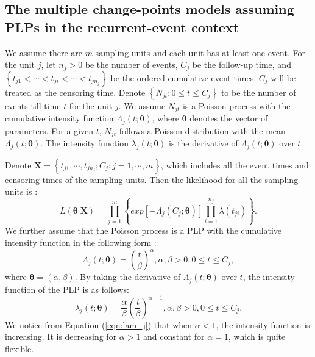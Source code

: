 \documentclass[12pt]{article}
\numberwithin{equation}{section}
\begin{document}
\subsection{The multiple change-points models assuming PLPs in the recurrent-event context}\label{sec:models.PLP}
We assume there are $m$ sampling units and each unit has at least one event. For the unit $j$, let $n_j>0$ be the number of events, $C_j$ be the follow-up time, and  $\left\lbrace t_{j1} < \cdots<t_{ji}<\cdots<t_{jn_j}\right\rbrace $ be the ordered cumulative event times. $C_j$ will be treated as the censoring time. Denote $\left\lbrace N_{jt}: 0\leq t \leq C_j\right\rbrace $ to be the number of events till time $t$ for the unit $j$. We assume  ${N_{jt}}$ is a Poisson process with the cumulative intensity function $\Lambda_j(t;\pmb\theta)$, where $\pmb\theta$ denotes the vector of parameters. For a given $t$, ${N_{jt}}$ follows a Poisson distribution with the mean $\Lambda_j(t;\pmb\theta)$. The intensity function $\lambda_j(t;\pmb\theta)$ is the derivative of $\Lambda_j(t;\pmb\theta)$ over $t$. 

Denote $\pmb X =\left\lbrace t_{j1},\cdots,t_{jn_j};C_j;j=1,\cdots,m\right\rbrace $, which includes all the event times and censoring times of the sampling units. Then the likelihood for all the sampling units is \citep{Thompson2012}:
\begin{equation}\label{eqn:l}
L(\pmb\theta|\pmb X) = \prod_{j=1}^{m}\left\lbrace exp\left[ -\Lambda_j(C_j;\pmb\theta)\right]\prod_{i=1}^{n_j}\lambda(t_{ji}) \right\rbrace. 
\end{equation} 
We further assume that the Poisson process is a PLP with the cumulative intensity function in the following form \citep{Crow1975}:
\begin{equation}\label{eqn:Lam_j}
\Lambda_j(t;\pmb\theta) = \left( \frac{t}{\beta}\right)^\alpha, \alpha, \beta >0, 0\leq t \leq C_j,
\end{equation} 
where $\pmb\theta = (\alpha, \beta)$. By taking the derivative of $\Lambda_j(t;\pmb\theta)$ over $t$, the intensity function of the PLP is as follows: 
\begin{equation}\label{eqn:lam_j}
\lambda_j(t;\pmb\theta) = \frac{\alpha}{\beta}\left( \frac{t}{\beta}\right)^{\alpha-1}, \alpha, \beta >0,0\leq t \leq C_j.
\end{equation}
We notice from Equation (\ref{eqn:lam_j}) that when $\alpha < 1$, the intensity function is increasing. It is decreasing for $\alpha > 1$ and constant for $\alpha = 1$, which is quite flexible. 
\end{document}
